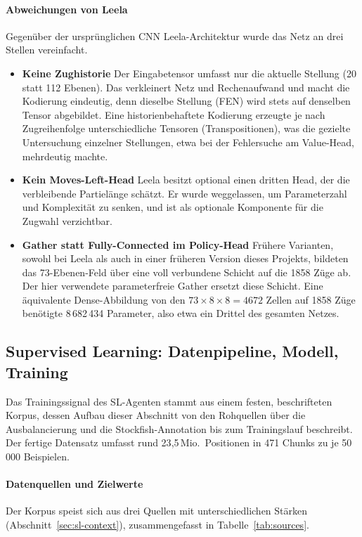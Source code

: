 \documentclass[
  a4paper, 12pt,
  parskip=half,
  headings=small,
  bibliography=totoc
]{scrartcl}
\begin{document}
\paragraph{Abweichungen von Leela}
Gegenüber der ursprünglichen CNN Leela-Architektur wurde das Netz an drei Stellen
vereinfacht.
\begin{itemize}
  \item \textbf{Keine Zughistorie} Der Eingabetensor umfasst nur die aktuelle
        Stellung (20 statt 112 Ebenen). Das verkleinert Netz und Rechenaufwand und
        macht die Kodierung eindeutig, denn dieselbe Stellung (FEN) wird stets auf
        denselben Tensor abgebildet. Eine historienbehaftete Kodierung erzeugte je
        nach Zugreihenfolge unterschiedliche Tensoren (Transpositionen), was die
        gezielte Untersuchung einzelner Stellungen, etwa bei der Fehlersuche am
        Value-Head, mehrdeutig machte.
  \item \textbf{Kein Moves-Left-Head} Leela besitzt optional einen dritten Head,
        der die verbleibende Partielänge schätzt. Er wurde weggelassen, um
        Parameterzahl und Komplexität zu senken, und ist als optionale Komponente
        für die Zugwahl verzichtbar.
  \item \textbf{Gather statt Fully-Connected im Policy-Head} Frühere Varianten,
        sowohl bei Leela \parencite{lc0issue637} als auch in einer früheren Version
        dieses Projekts, bildeten das 73-Ebenen-Feld über eine voll verbundene
        Schicht auf die 1858 Züge ab. Der hier verwendete parameterfreie Gather
        ersetzt diese Schicht. Eine äquivalente Dense-Abbildung von den
        \(73\times8\times8 = 4672\) Zellen auf 1858 Züge benötigte 8\,682\,434
        Parameter, also etwa ein Drittel des gesamten Netzes.
\end{itemize}

\subsection{Supervised Learning: Datenpipeline, Modell, Training}\label{sec:sl-impl} %
Das Trainingssignal des SL-Agenten stammt aus einem festen, beschrifteten Korpus,
dessen Aufbau dieser Abschnitt von den Rohquellen über die Ausbalancierung und die
Stockfish-Annotation bis zum Trainingslauf beschreibt. Der fertige Datensatz
umfasst rund 23{,}5\,Mio.\ Positionen in 471 Chunks zu je 50\,000 Beispielen.

\paragraph{Datenquellen und Zielwerte}
Der Korpus speist sich aus drei Quellen mit unterschiedlichen Stärken
(Abschnitt~\ref{sec:sl-context}), zusammengefasst in Tabelle~\ref{tab:sources}.
\end{document}
